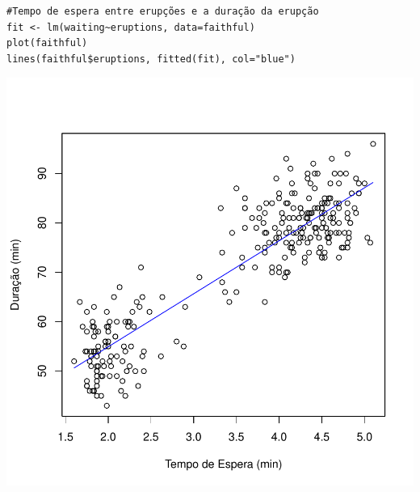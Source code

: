 \documentclass[14pt,aspectratio=1610]{beamer}
\begin{document}
\begin{frame}[fragile]{}
\frametitle{ }
\begin{block}{}
\begin{center}
\begin{verbatim}
#Tempo de espera entre erupções e a duração da erupção
fit <- lm(waiting~eruptions, data=faithful)
plot(faithful)
lines(faithful$eruptions, fitted(fit), col="blue")
\end{verbatim}
\end{center}
\end{block}
\vspace{-1.3cm}
\begin{center}
\includegraphics{Figuras/Aula20-006}
\end{center}
\end{frame}
\end{document}
